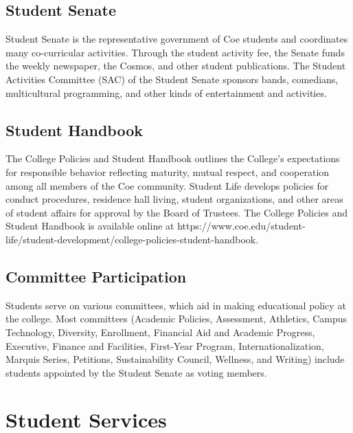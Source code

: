 \documentclass[
  letterpaper,
]{scrbook}
\begin{document}
\hypertarget{student-senate}{%
\subsection{Student Senate}\label{student-senate}}

Student Senate is the representative government of Coe students and
coordinates many co-curricular activities. Through the student activity
fee, the Senate funds the weekly newspaper, the Cosmos, and other
student publications. The Student Activities Committee (SAC) of the
Student Senate sponsors bands, comedians, multicultural programming, and
other kinds of entertainment and activities.

\hypertarget{student-handbook}{%
\subsection{Student Handbook}\label{student-handbook}}

The College Policies and Student Handbook outlines the College's
expectations for responsible behavior reflecting maturity, mutual
respect, and cooperation among all members of the Coe community. Student
Life develops policies for conduct procedures, residence hall living,
student organizations, and other areas of student affairs for approval
by the Board of Trustees. The College Policies and Student Handbook is
available online at
https://www.coe.edu/student-life/student-development/college-policies-student-handbook.

\hypertarget{committee-participation}{%
\subsection{Committee Participation}\label{committee-participation}}

Students serve on various committees, which aid in making educational
policy at the college. Most committees (Academic Policies, Assessment,
Athletics, Campus Technology, Diversity, Enrollment, Financial Aid and
Academic Progress, Executive, Finance and Facilities, First-Year
Program, Internationalization, Marquis Series, Petitions, Sustainability
Council, Wellness, and Writing) include students appointed by the
Student Senate as voting members.

\hypertarget{student-services}{%
\section{Student Services}\label{student-services}}
\end{document}
